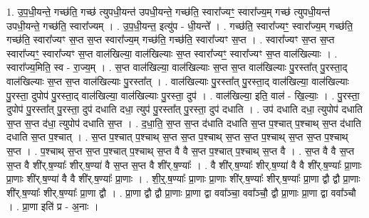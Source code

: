 \documentclass[17pt]{extarticle}
\begin{document}
1. उ॒प॒धी॒यन्ते॒ गच्छ॑ति॒ गच्छ॑ त्युपधी॒यन्त॑ उपधी॒यन्ते॒ गच्छ॑ति॒ स्वारा᳚ज्यꣳ॒॒ स्वारा᳚ज्य॒म् गच्छ॑ त्युपधी॒यन्त॑ उपधी॒यन्ते॒ गच्छ॑ति॒ स्वारा᳚ज्यम् । . उ॒प॒धी॒यन्त॒ इत्यु॑प - धी॒यन्ते᳚ । . गच्छ॑ति॒ स्वारा᳚ज्यꣳ॒॒ स्वारा᳚ज्य॒म् गच्छ॑ति॒ गच्छ॑ति॒ स्वारा᳚ज्यꣳ स॒प्त स॒प्त स्वारा᳚ज्य॒म् गच्छ॑ति॒ गच्छ॑ति॒ स्वारा᳚ज्यꣳ स॒प्त । . स्वारा᳚ज्यꣳ स॒प्त स॒प्त स्वारा᳚ज्यꣳ॒॒ स्वारा᳚ज्यꣳ स॒प्त वाल॑खिल्या॒ वाल॑खिल्याः स॒प्त स्वारा᳚ज्यꣳ॒॒ स्वारा᳚ज्यꣳ स॒प्त वाल॑खिल्याः । . स्वारा᳚ज्य॒मिति॒ स्व - रा॒ज्य॒म् । . स॒प्त वाल॑खिल्या॒ वाल॑खिल्याः स॒प्त स॒प्त वाल॑खिल्याः पु॒रस्ता᳚त् पु॒रस्ता॒द् वाल॑खिल्याः स॒प्त स॒प्त वाल॑खिल्याः पु॒रस्ता᳚त् । . वाल॑खिल्याः पु॒रस्ता᳚त् पु॒रस्ता॒द् वाल॑खिल्या॒ वाल॑खिल्याः पु॒रस्ता॒ दुपोप॑ पु॒रस्ता॒द् वाल॑खिल्या॒ वाल॑खिल्याः पु॒रस्ता॒ दुप॑ । . वाल॑खिल्या॒ इति॒ वाल॑ - खि॒ल्याः॒ । . पु॒रस्ता॒ दुपोप॑ पु॒रस्ता᳚त् पु॒रस्ता॒ दुप॑ दधाति दधा॒ त्युप॑ पु॒रस्ता᳚त् पु॒रस्ता॒ दुप॑ दधाति । . उप॑ दधाति दधा॒ त्युपोप॑ दधाति स॒प्त स॒प्त द॑धा॒ त्युपोप॑ दधाति स॒प्त । . द॒धा॒ति॒ स॒प्त स॒प्त द॑धाति दधाति स॒प्त प॒श्चात् प॒श्चाथ् स॒प्त द॑धाति दधाति स॒प्त प॒श्चात् । . स॒प्त प॒श्चात् प॒श्चाथ् स॒प्त स॒प्त प॒श्चाथ् स॒प्त स॒प्त प॒श्चाथ् स॒प्त स॒प्त प॒श्चाथ् स॒प्त । . प॒श्चाथ् स॒प्त स॒प्त प॒श्चात् प॒श्चाथ् स॒प्त वै वै स॒प्त प॒श्चात् प॒श्चाथ् स॒प्त वै । . स॒प्त वै वै स॒प्त स॒प्त वै शी॑र्.ष॒ण्याः᳚ शीर्.ष॒ण्या॑ वै स॒प्त स॒प्त वै शी॑र्.ष॒ण्याः᳚ । . वै शी॑र्.ष॒ण्याः᳚ शीर्.ष॒ण्या॑ वै वै शी॑र्.ष॒ण्याः᳚ प्रा॒णाः प्रा॒णाः शी॑र्.ष॒ण्या॑ वै वै शी॑र्.ष॒ण्याः᳚ प्रा॒णाः । . शी॒र्॒.ष॒ण्याः᳚ प्रा॒णाः प्रा॒णाः शी॑र्.ष॒ण्याः᳚ शीर्.ष॒ण्याः᳚ प्रा॒णा द्वौ द्वौ प्रा॒णाः शी॑र्.ष॒ण्याः᳚ शीर्.ष॒ण्याः᳚ प्रा॒णा द्वौ । . प्रा॒णा द्वौ द्वौ प्रा॒णाः प्रा॒णा द्वा ववा᳚ञ्चा॒ ववा᳚ञ्चौ॒ द्वौ प्रा॒णाः प्रा॒णा द्वा ववा᳚ञ्चौ । . प्रा॒णा इति॑ प्र - अ॒नाः । \newline
\end{document}
